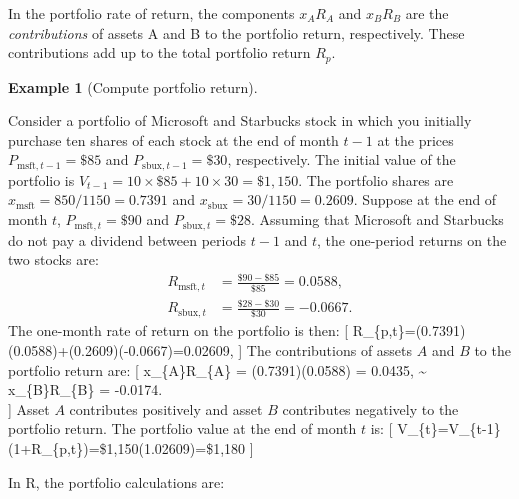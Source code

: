 \documentclass[
  letterpaper,
  DIV=11,
  numbers=noendperiod]{scrreprt}
\theoremstyle{definition}
\theoremstyle{definition}
\newtheorem{example}{Example}[chapter]
\theoremstyle{remark}
\begin{document}
In the portfolio rate of return, the components \(x_{A}R_{A}\) and
\(x_{B}R_{B}\) are the \emph{contributions} of assets A and B to the
portfolio return, respectively. These contributions add up to the total
portfolio return \(R_{p}\).

\begin{example}[Compute portfolio
return]\protect\hypertarget{exm-example0108}{}\label{exm-example0108}

Consider a portfolio of Microsoft and Starbucks stock in which you
initially purchase ten shares of each stock at the end of month \(t-1\)
at the prices \(P_{\textrm{msft},t-1}=\$85\) and
\(P_{\textrm{sbux},t-1}=\$30\), respectively. The initial value of the
portfolio is \(V_{t-1}=10\times\$85+10\times30=\$1,150\). The portfolio
shares are \(x_{\textrm{msft}}=850/1150=0.7391\) and
\(x_{\textrm{sbux}}=30/1150=0.2609\). Suppose at the end of month \(t\),
\(P_{\textrm{msft},t}=\$90\) and \(P_{\textrm{sbux},t}=\$28\). Assuming
that Microsoft and Starbucks do not pay a dividend between periods
\(t-1\) and \(t\), the one-period returns on the two stocks are:
\begin{align*}
R_{\textrm{msft},t} & =\frac{\$90-\$85}{\$85}=0.0588,\\
R_{\textrm{sbux},t} & =\frac{\$28-\$30}{\$30}=-0.0667.
\end{align*} The one-month rate of return on the portfolio is then: {[}
R\_\{p,t\}=(0.7391)(0.0588)+(0.2609)(-0.0667)=0.02609, {]} The
contributions of assets \(A\) and \(B\) to the portfolio return are: {[}
x\_\{A\}R\_\{A\} = (0.7391)(0.0588) = 0.0435, \textasciitilde{}
x\_\{B\}R\_\{B\} = -0.0174.\\
{]} Asset \(A\) contributes positively and asset \(B\) contributes
negatively to the portfolio return. The portfolio value at the end of
month \(t\) is: {[}
V\_\{t\}=V\_\{t-1\}(1+R\_\{p,t\})=\$1,150\times(1.02609)=\$1,180 {]}

In R, the portfolio calculations are:

\end{example}
\end{document}
